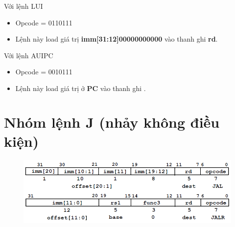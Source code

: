 \documentclass[E:/Latex/ExtraWork/ComputerArchitechture/Report.tex]{subfiles}
\begin{document}
	Với lệnh LUI
	 	\begin{itemize}
	 		\item Opcode = 0110111
	 		\item Lệnh này load giá trị \textbf {imm[31:12]00000000000} vào thanh ghi \textbf {rd}.
	 	\end{itemize}
	 	
	Với lệnh AUIPC
	 	\begin{itemize}
	 		\item Opcode = 0010111
	 		\item Lệnh này load giá trị ở \textbf{PC} vào thanh ghi .
	 	\end{itemize}
\section{Nhóm lệnh J (nhảy không điều kiện)}
	\begin{figure}[h!]
					\includegraphics[scale = 0.7]{Figure/Fig10.png}
					\centering
			\end{figure}
\end{document}
